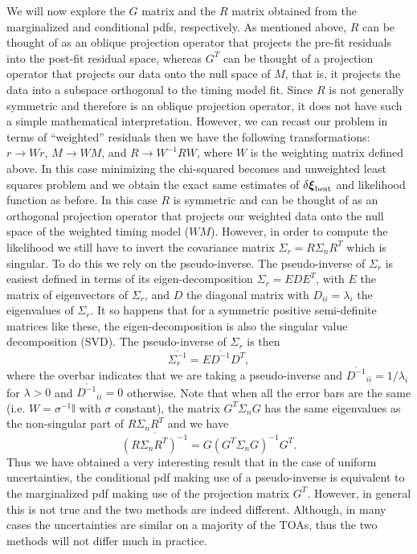 \documentclass[iop]{emulateapj}
\newcommand{\be}{\begin{equation}}
\newcommand{\ee}{\end{equation}}
\begin{document}
We will now explore the $G$ matrix and the $R$ matrix obtained from the marginalized and conditional pdfs, respectively. As mentioned above, $R$ can be thought of as an oblique projection operator that projects the pre-fit residuals into the post-fit residual space, whereas $G^{T}$ can be thought of a projection operator that projects our data onto the null space of $M$, that is, it projects the data into a subspace orthogonal to the timing model fit. Since $R$ is not generally symmetric and therefore is an oblique projection operator, it does not have such a simple mathematical interpretation. However, we can recast our problem in terms of ``weighted'' residuals then we have the following transformations: $r\rightarrow Wr$, $M\rightarrow WM$, and $R\rightarrow W^{-1}RW$, where $W$ is the weighting matrix defined above. In this case minimizing the chi-squared becomes and unweighted least squares problem and we obtain the exact same estimates of $\delta\boldsymbol{\xi}_{\rm best}$ and  likelihood function as before. In this case $R$ is symmetric and can be thought of as an orthogonal projection operator that projects our weighted data onto the null space of the weighted timing model ($WM$). However, in order to compute the likelihood we still have to invert the covariance matrix $\Sigma_{r}=R\Sigma_{n}R^{T}$ which is singular. To do this we rely on the pseudo-inverse. The pseudo-inverse of $\Sigma_{r}$ is easiest defined in terms of its eigen-decomposition $\Sigma_{r}=EDE^{T}$, with $E$ the matrix of eigenvectors of $\Sigma_{r}$, and $D$ the diagonal matrix with $D_{ii}=\lambda_{i}$ the eigenvalues of $\Sigma_{r}$. It so happens that for a symmetric positive semi-definite matrices like these, the eigen-decomposition is also the singular value decomposition (SVD). The pseudo-inverse of $\Sigma_{r}$ is then
\be
\overline{\Sigma_{r}^{-1}}=E\overline{D^{-1}}D^{T},
\ee  
where the overbar indicates that we are taking a pseudo-inverse and $\overline{D^{-1}}_{ii}=1/\lambda_{i}$ for $\lambda>0$ and $\overline{D^{-1}}_{ii}=0$ otherwise. Note that when all the error bars are the same (i.e. $W=\sigma^{-1}\mathbb{I}$ with $\sigma$ constant), the matrix $G^{T}\Sigma_{n}G$ has the same eigenvalues as the non-singular part of $R\Sigma_{n}R^{T}$ and we have
\be
\overline{(R\Sigma_{n}R^{T})^{-1}}=G(G^{T}\Sigma_{n}G)^{-1}G^{T}.
\ee
Thus we have obtained a very interesting result that in the case of uniform uncertainties, the conditional pdf making use of  a pseudo-inverse is equivalent to the marginalized pdf making use of the projection matrix $G^{T}$. However, in general this is not true and the two methods are indeed different. Although, in many cases the uncertainties are similar on a majority of the TOAs, thus the two methods will not differ much in practice.








\end{document}
